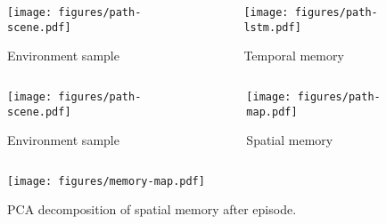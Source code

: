 \begin{frame}
    \begin{columns}
        \begin{column}{0.55\textwidth}
            \begin{figure}
                \centering
                \texttt{[image: figures/path-scene.pdf]}
                \par Environment sample
            \end{figure}
        \end{column}
        \begin{column}{0.5\textwidth}
            \begin{figure}
                \centering
                \texttt{[image: figures/path-lstm.pdf]}
                \par Temporal memory
            \end{figure}
        \end{column}
    \end{columns}
\end{frame}

\begin{frame}
    \begin{columns}
        \begin{column}{0.55\textwidth}
            \begin{figure}
                \centering
                \texttt{[image: figures/path-scene.pdf]}
                \par Environment sample
            \end{figure}
        \end{column}
        \begin{column}{0.5\textwidth}
            \begin{figure}
                \centering
                \texttt{[image: figures/path-map.pdf]}
                \par Spatial memory 
            \end{figure}
        \end{column}
    \end{columns}
\end{frame}

\begin{frame}
    \begin{figure}
        \centering
        \texttt{[image: figures/memory-map.pdf]}
        \par PCA decomposition of spatial memory after episode.
    \end{figure}
\end{frame}


